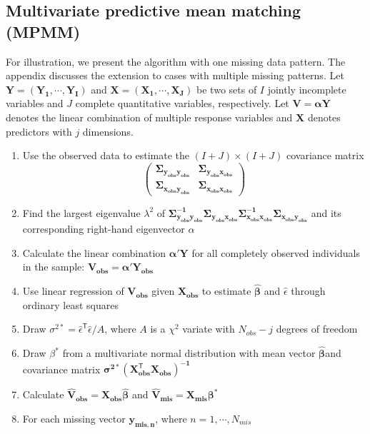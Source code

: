 	\subsection{Multivariate predictive mean matching (MPMM)}
	\label{sec:3.2.3}
	For illustration, we present the algorithm with one missing data pattern. The appendix discusses the extension to cases with multiple missing patterns. 
	Let $\boldsymbol{Y=(Y_1,\cdots,Y_I)}$ and $\boldsymbol{X=(X_1,\cdots,X_J)}$ be two sets of $I$ jointly incomplete variables and $J$ complete  quantitative variables, respectively. Let $\boldsymbol{V = \alpha Y}$ denotes the linear combination of multiple response variables and $\boldsymbol{X}$ denotes predictors with $j$ dimensions. 
	\begin{enumerate}
		\item Use the observed data to estimate the $(I+J)\times(I+J)$ covariance matrix
		\[ \left( \begin{array}{cc}
			\boldsymbol{\Sigma_{y_{obs}y_{obs}}} & \boldsymbol{\Sigma_{y_{obs}x_{obs}}}  \\
			\boldsymbol{\Sigma_{x_{obs}y_{obs}}} & \boldsymbol{\Sigma_{x_{obs}x_{obs}}}  \end{array} \right)\]
		\item Find the largest eigenvalue $\lambda^2$ of $\boldsymbol{\Sigma^{-1}_{y_{obs}y_{obs}}\Sigma_{y_{obs}x_{obs}}\Sigma^{-1}_{x_{obs}x_{obs}}\Sigma_{x_{obs}y_{obs}}}$ and its corresponding right-hand eigenvector $\alpha$
		\item Calculate the linear combination $\boldsymbol{\alpha'Y}$ for all completely observed individuals in the sample: $\boldsymbol{V_{obs}=\alpha'Y_{obs}}$ 
		\item Use linear regression of $\boldsymbol{V_{obs}}$ given $\boldsymbol{X_{obs}}$ to estimate $\boldsymbol{\hat{\beta}}$ and $\hat{\epsilon}$ through ordinary least squares
		\item Draw $\sigma^{2\ast}=\hat{\epsilon}^\mathsf{T}\hat{\epsilon}/A$, where $A$ is a $\chi^2$ variate with $N_{obs}-j$ degrees of freedom
		\item Draw $\beta^{\ast}$ from a multivariate normal distribution with mean vector $\boldsymbol{\hat{\beta}}$and covariance matrix $\boldsymbol{\sigma^{2\ast}(X^\mathsf{T}_{obs}X_{obs})^{-1}}$
		\item Calculate $\boldsymbol{\hat{V}_{obs}=X_{obs}\hat{\beta}}$ and $\boldsymbol{\hat{V}_{mis}=X_{mis}\beta^{\ast}}$
		\item For each missing vector $\boldsymbol{y_{mis,n}}$, where $n=1,\cdots,N_{mis}$

\end{enumerate}
